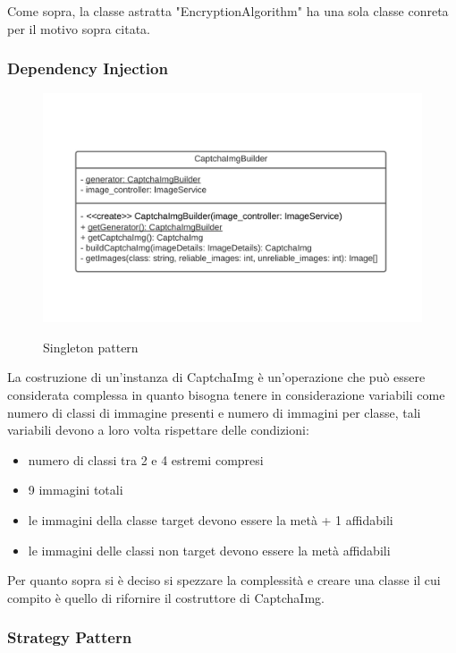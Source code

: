 Come sopra, la classe astratta "EncryptionAlgorithm" ha una sola classe conreta per il motivo sopra citata.

\subsubsection{Dependency Injection}

\begin{figure}[H]
    \centering
    \includegraphics[scale = 1.0]{img/singleton.png}\\
    \caption{Singleton pattern}
\end{figure}

La costruzione di un'instanza di CaptchaImg è un'operazione che può essere considerata complessa in quanto
bisogna tenere in considerazione variabili come numero di classi di immagine presenti e numero di immagini per classe,
tali variabili devono a loro volta rispettare delle condizioni:
\begin{itemize}
    \item numero di classi tra 2 e 4 estremi compresi
    \item 9 immagini totali
    \item le immagini della classe target devono essere la metà + 1 affidabili
    \item le immagini delle classi non target devono essere la metà affidabili
\end{itemize}
Per quanto sopra si è deciso si spezzare la complessità e creare una classe il cui compito è quello di rifornire il costruttore
di CaptchaImg. 

\subsubsection{Strategy Pattern}

